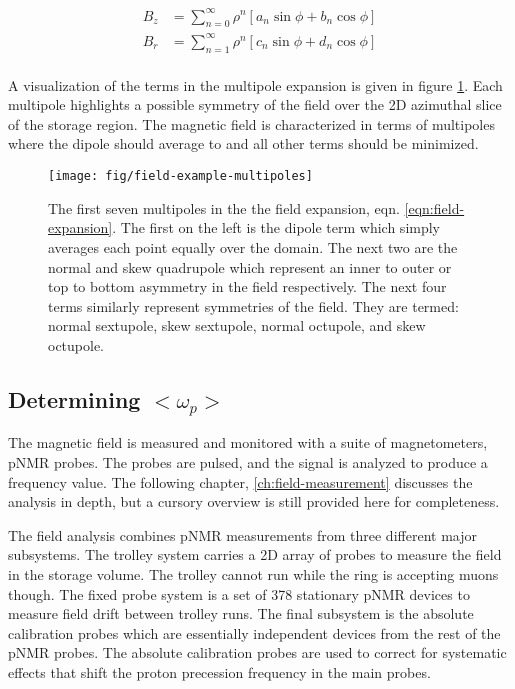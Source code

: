 \begin{align}
\label{eqn:field-expansion}
B_z & = \sum_{n=0}^{\infty} \rho^n[a_n \sin{\phi} + b_n \cos{\phi}] \\
B_r & = \sum_{n=1}^{\infty} \rho^n[c_n \sin{\phi} + d_n \cos{\phi}] \\
\end{align}

\noindent
A visualization of the terms in the multipole expansion is given in figure \ref{fig:field-example-multipoles}.  Each multipole highlights a possible symmetry of the field over the 2D azimuthal slice of the storage region. The magnetic field is characterized in terms of multipoles where the dipole should average to \bmagic and all other terms should be minimized.

\begin{figure}
\label{fig:field-example-multipoles}
\texttt{[image: fig/field-example-multipoles]}
\caption{The first seven multipoles in the the field expansion, eqn. \ref{eqn:field-expansion}.  The first on the left is the dipole term which simply averages each point equally over the domain.  The next two are the normal and skew quadrupole which represent an inner to outer or top to bottom asymmetry in the field respectively.  The next four terms similarly represent symmetries of the field.  They are termed: normal sextupole, skew sextupole, normal octupole, and skew octupole.}
\end{figure}

\subsection{Determining $<\omega_p>$}

The magnetic field is measured and monitored with a suite of magnetometers, pNMR probes.  The probes are pulsed, and the signal is analyzed to produce a frequency value. The following chapter, \ref{ch:field-measurement} discusses the analysis in depth, but a cursory overview is still provided here for completeness.  

The field analysis combines pNMR measurements from three different major subsystems.  The trolley system carries a 2D array of probes to measure the field in the storage volume.  The trolley cannot run while the ring is accepting muons though.  The fixed probe system is a set of 378 stationary pNMR devices to measure field drift between trolley runs.  The final subsystem is the absolute calibration probes which are essentially independent devices from the rest of the pNMR probes.  The absolute calibration probes are used to correct for systematic effects that shift the proton precession frequency in the main probes.  

